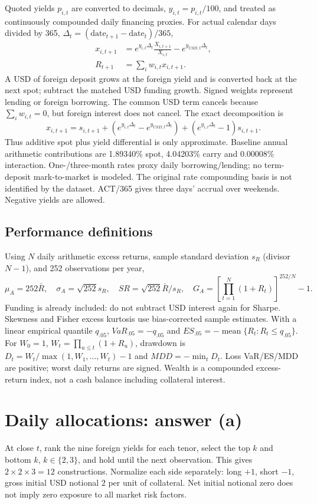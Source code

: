 \documentclass[10pt,letterpaper]{article}
\newcommand{\rSpotMean}{1.89340}
\newcommand{\rCarryMean}{4.04203}
\newcommand{\rInteractionMean}{0.00008}
\begin{document}
Quoted yields $p_{i,t}$ are converted to decimals, $y_{i,t}=p_{i,t}/100$, and treated as
continuously compounded daily financing proxies. For actual calendar days divided by 365,
$\Delta_t=(\mathrm{date}_{t+1}-\mathrm{date}_t)/365$,
\begin{align}
x_{i,t+1}&=e^{y_{i,t}\Delta_t}\frac{X_{i,t+1}}{X_{i,t}}-e^{y_{USD,t}\Delta_t},\\
R_{t+1}&=\sum_i w_{i,t}x_{i,t+1}.
\end{align}
A USD of foreign deposit grows at the foreign yield and is converted back at the next spot;
subtract the matched USD funding growth. Signed weights represent lending or foreign borrowing.
The common USD term cancels because $\sum_iw_{i,t}=0$, but foreign interest does not cancel.
The exact decomposition is
\[
x_{i,t+1}=s_{i,t+1}+\left(e^{y_{i,t}\Delta_t}-e^{y_{USD,t}\Delta_t}\right)
+\left(e^{y_{i,t}\Delta_t}-1\right)s_{i,t+1}.
\]
Thus additive spot plus yield differential is only approximate. Baseline annual arithmetic
contributions are \rSpotMean{}\% spot, \rCarryMean{}\% carry and \rInteractionMean{}\% interaction.
One-/three-month rates proxy daily borrowing/lending; no term-deposit mark-to-market is modeled.
The original rate compounding basis is not identified by the dataset. ACT/365 gives three days'
accrual over weekends. Negative yields are allowed.

\subsection{Performance definitions}
Using $N$ daily arithmetic excess returns, sample standard deviation $s_R$ (divisor $N-1$),
and 252 observations per year,
\[
\mu_A=252\bar R,\quad \sigma_A=\sqrt{252}s_R,\quad SR=\sqrt{252}\bar R/s_R,\quad
G_A=\left[\prod_{t=1}^{N}(1+R_t)\right]^{252/N}-1.
\]
Funding is already included: do not subtract USD interest again for Sharpe. Skewness and Fisher
excess kurtosis use bias-corrected sample estimates. With a linear empirical quantile $q_{.05}$,
$VaR_{.05}=-q_{.05}$ and $ES_{.05}=-\operatorname{mean}\{R_t:R_t\le q_{.05}\}$.
For $W_0=1$, $W_t=\prod_{u\le t}(1+R_u)$, drawdown is
$D_t=W_t/\max(1,W_1,\ldots,W_t)-1$ and $MDD=-\min_tD_t$.
Loss VaR/ES/MDD are positive; worst daily returns are signed. Wealth is a compounded
excess-return index, not a cash balance including collateral interest.
\newpage
\section{Daily allocations: answer (a)}
At close $t$, rank the nine foreign yields for each tenor, select the top $k$ and bottom $k$,
$k\in\{2,3\}$, and hold until the next observation. This gives $2\times2\times3=12$ constructions.
Normalize each side separately: long $+1$, short $-1$, gross initial USD notional $2$ per unit
of collateral. Net initial notional zero does not imply zero exposure to all market risk factors.
\end{document}
